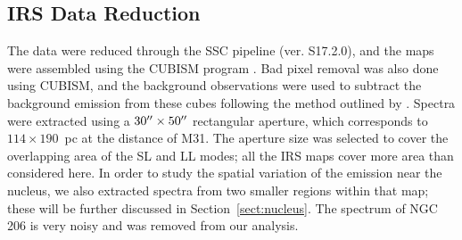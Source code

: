 \subsection{IRS Data Reduction}
\label{sect:irs_data}

The data were reduced through the SSC pipeline (ver. S17.2.0), and the maps were assembled using the CUBISM program \citep{Smith:2007fk}. 
Bad pixel removal was also done using CUBISM, and the background observations were used to subtract the background emission from these cubes 
following the method outlined by \citet{Gordon:2008lr}. Spectra were extracted using a $30\hbox{$^{\prime\prime}$}\times50\hbox{$^{\prime\prime}$}$   rectangular aperture,
which corresponds to $114\times190$~pc at the distance of M31.
The aperture size was selected to cover the overlapping area of the SL and LL modes; all the IRS maps cover more area than  considered here.
In order to study the spatial variation of the emission near the nucleus, we also extracted spectra from two smaller regions
within that map; these will be further discussed in Section~\ref{sect:nucleus}.
The spectrum of NGC 206 is very noisy and was removed from our analysis. 

%
%
%


